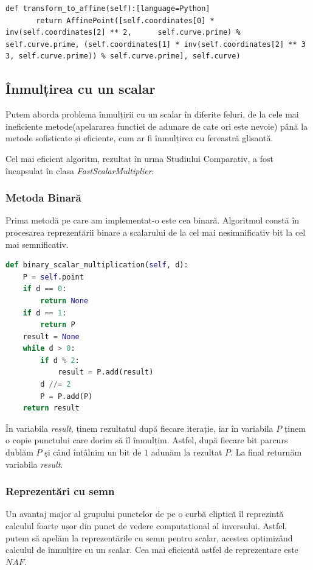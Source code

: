 \begin{lstlisting}
def transform_to_affine(self):[language=Python]
       return AffinePoint([self.coordinates[0] * inv(self.coordinates[2] ** 2, 	    self.curve.prime) % self.curve.prime, (self.coordinates[1] * inv(self.coordinates[2] ** 3  3, self.curve.prime)) % self.curve.prime], self.curve)
\end{lstlisting}

\subsection{Înmulțirea cu un scalar}

Putem aborda problema înmulțirii cu un scalar în diferite feluri, de la cele mai ineficiente metode(apelararea functiei de adunare de cate ori este nevoie) până la metode sofisticate și eficiente, cum ar fi înmulțirea cu fereastră glisantă.

Cel mai eficient algoritm, rezultat în urma Studiului Comparativ, a fost încapsulat în clasa \textit{FastScalarMultiplier}. 

\subsubsection{Metoda Binară}

Prima metodă pe care am implementat-o este cea binară. Algoritmul constă în procesarea reprezentării binare a scalarului de la cel mai nesimnificativ bit la cel mai semnificativ.

\begin{lstlisting}[language=Python]
def binary_scalar_multiplication(self, d):
    P = self.point
    if d == 0:
        return None
    if d == 1:
        return P
    result = None
    while d > 0:
        if d % 2:
            result = P.add(result)
        d //= 2
        P = P.add(P)
    return result
\end{lstlisting}

În variabila \textit{result}, ținem rezultatul după fiecare iterație, iar în variabila $P$ ținem o copie punctului care dorim să îl înmulțim. Astfel, după fiecare bit parcurs dublăm $P$ și când întâlnim un bit de $1$ adunăm la rezultat $P$. La final returnăm variabila \textit{result}.

\subsubsection{Reprezentări cu semn}

Un avantaj major al grupului punctelor de pe o curbă eliptică îl reprezintă calculul foarte ușor din punct de vedere computațional al inversului. Astfel, putem să apelăm la reprezentările cu semn pentru scalar, acestea optimizând calculul de înmulțire cu un scalar. Cea mai eficientă astfel de reprezentare este $NAF$. \\

